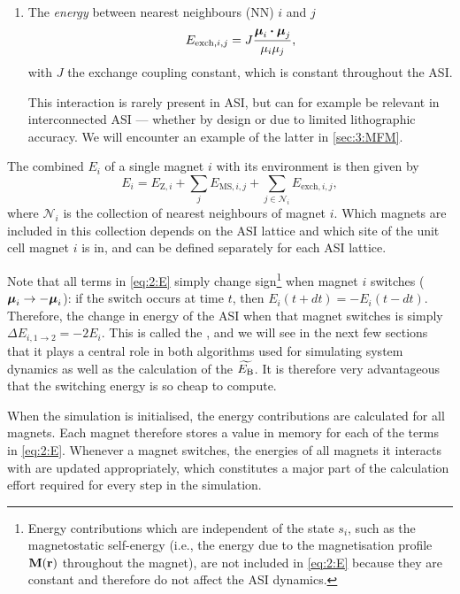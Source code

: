 \begin{enumerate}
	\item The \textit{ energy} between nearest neighbours (NN) $i$ and $j$
	\begin{equation}
		\label{eq:2:E_exch}
		E_{\mathrm{exch},i,j} = J \frac{\boldsymbol{\mathbf{\mu}}_i \boldsymbol{\cdot} \boldsymbol{\mathbf{\mu}}_j}{\mu_i \mu_j} \mathrm{,}
	\end{equation}
	with $J$ the exchange coupling constant, which is constant throughout the ASI. \par
	This interaction is rarely present in ASI, but can for example be relevant in interconnected ASI --- whether by design or due to limited lithographic accuracy.
	We will encounter an example of the latter in \cref{sec:3:MFM}.
\end{enumerate}

The combined  $E_i$ of a single magnet $i$ with its environment is then given by
\begin{equation}
	\label{eq:2:E}
	E_i = E_{\mathrm{Z},i} + \sum_j E_{\mathrm{MS},i,j} + \sum_{j \in \mathcal{N}_i} E_{\mathrm{exch},i,j} \mathrm{,}
\end{equation}
where $\mathcal{N}_i$ is the collection of nearest neighbours of magnet $i$.
Which magnets are included in this collection depends on the ASI lattice and which site of the unit cell magnet $i$ is in, and can be defined separately for each ASI lattice. \\\par
Note that all terms in \cref{eq:2:E} simply change sign\footnote{
	Energy contributions which are independent of the state $s_i$, such as the magnetostatic self-energy (i.e., the energy due to the magnetisation profile $\boldsymbol{\mathbf{M}}(\boldsymbol{\mathbf{r}})$ throughout the magnet), are not included in \cref{eq:2:E} because they are constant and therefore do not affect the ASI dynamics.
} when magnet $i$ switches ($\boldsymbol{\mathbf{\mu}}_i \rightarrow -\boldsymbol{\mathbf{\mu}}_i$): if the switch occurs at time $t$, then $E_i(t + dt) = -E_i(t - dt)$.
Therefore, the change in energy of the ASI when that magnet switches is simply $\Delta E_{i,1\rightarrow2} = -2 E_i$.
This is called the , and we will see in the next few sections that it plays a central role in both algorithms used for simulating system dynamics as well as the calculation of the  $\widetilde{E_\mathrm{B}}$.
It is therefore very advantageous that the switching energy is so cheap to compute. \\\par
When the simulation is initialised, the energy contributions are calculated for all magnets.
Each magnet therefore stores a value in memory for each of the terms in \cref{eq:2:E}.
Whenever a magnet switches, the energies of all magnets it interacts with are updated appropriately, which constitutes a major part of the calculation effort required for every step in the simulation.

